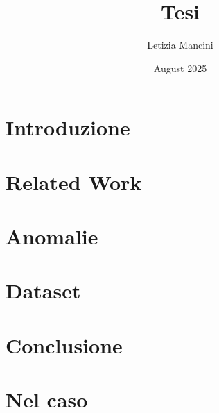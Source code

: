 \documentclass{report}
\title{Tesi}
\author{Letizia Mancini}
\date{August 2025}
\begin{document}


\newpage
\thispagestyle{empty}
\mbox{}
\newpage


\tableofcontents

\chapter{Introduzione}


\chapter{Related Work}


\chapter{Anomalie}


\chapter{Dataset}


\chapter{Conclusione}


\chapter{Nel caso}


{
  \setlength{\emergencystretch}{10em}
  \printbibliography
}
\end{document}
